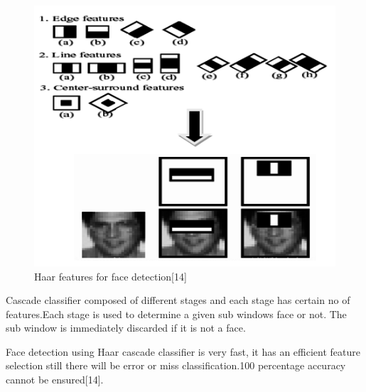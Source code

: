  \begin{figure}[H]
 \centering
  \includegraphics[scale=0.8]{haar.png}
  \caption[Haar features for face detection]{ Haar features for face detection[14]}
  \label{haar}
\end{figure}
\noindent
Cascade classifier composed of different stages and each stage has certain no of features.Each stage is used to determine a given sub windows face or not. The sub window is immediately discarded if it is not a face.

  \vspace*{1pc}
Face detection using Haar cascade classifier is very fast, it has an efficient feature selection still there will be error or miss classification.100 percentage accuracy cannot be ensured[14].

